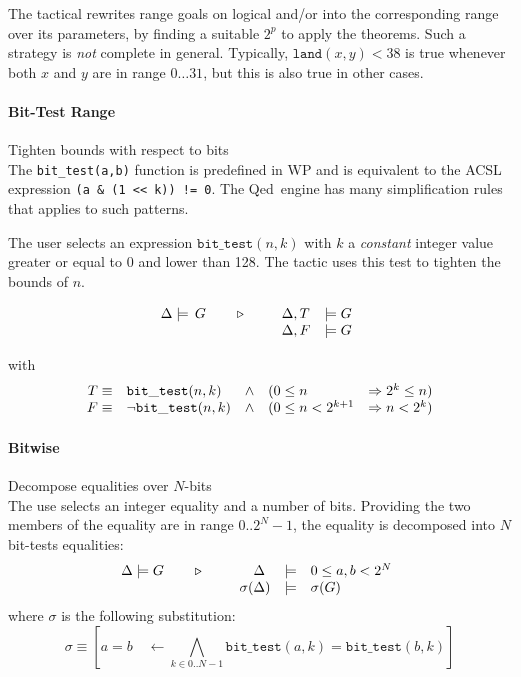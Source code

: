 The tactical rewrites range goals on logical and/or into the corresponding range over its parameters, by finding a suitable $2^p$
to apply the theorems. Such a strategy is \emph{not} complete in general.
Typically, $\mathtt{land}(x,y) < 38$ is true whenever both $x$ and $y$ are in range $0\ldots 31$, but this is also true
in other cases.

\paragraph{Bit-Test Range} Tighten bounds with respect to bits \\
The \lstinline{bit_test(a,b)} function is predefined in \textsf{WP} and is equivalent
to the \textsf{ACSL} expression \lstinline{(a & (1 << k)) != 0}. The
\textsf{Qed} engine has many simplification rules that applies to
such patterns.

The user selects an expression $\mathtt{bit\_test}(n,k)$ with $k$
a \emph{constant} integer value greater or equal to 0 and lower than
128. The tactic uses this test to tighten the bounds of $n$.

$$\TACTIC{\Delta\models\,G}{%
\begin{array}[t]{ll}
\Delta,T &\models G \\
\Delta,F &\models G
\end{array}} $$

with
$$\begin{array}[t]{rlcll}
  T \equiv & \mathtt{bit\_test}(n,k) & \wedge & (0 \leq n & \Rightarrow 2^{k} \leq n) \\
  F \equiv & \neg \mathtt{bit\_test}(n,k) & \wedge & (0 \leq n < 2^{k+1} & \Rightarrow n < 2^{k})
  \end{array}
$$

\paragraph{Bitwise} Decompose equalities over $N$-bits\\
The use selects an integer equality and a number of bits.
Providing the two members of the equality are in range $0..2^N-1$,
the equality is decomposed into $N$ bit-tests equalities:
\[\TACTIC{\Delta\models G}{%
\begin{array}[t]{rcl}
\Delta\phantom{)} &\models & 0 \leq a,b < 2^N \\
\sigma(\Delta) & \models & \sigma(G)
\end{array}
}\]
where $\sigma$ is the following substitution:
\[ \sigma \equiv
\left[ a=b \quad \leftarrow
\bigwedge_{k\in 0..N-1} \mathtt{bit\_test}(a,k) = \mathtt{bit\_test}(b,k)
\right]
\]

